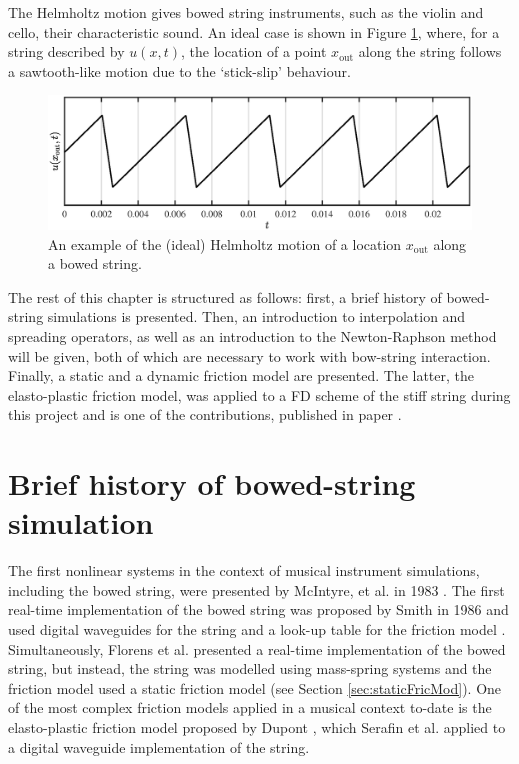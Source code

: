 The Helmholtz motion gives bowed string instruments, such as the violin and cello, their characteristic sound. An ideal case is shown in Figure \ref{fig:helmholtzTimedomain}, where, for a string described by $u(x,t)$, the location of a point $x_\text{out}$ along the string follows a sawtooth-like motion due to the `stick-slip' behaviour. 
\begin{figure}[t]
    \centering
    \includegraphics[width=\textwidth]{figures/exciters/helmholtzTimedomain.eps}
    \caption{An example of the (ideal) Helmholtz motion of a location $x_\text{out}$ along a bowed string. \label{fig:helmholtzTimedomain}}
\end{figure}

The rest of this chapter is structured as follows: first, a brief history of bowed-string simulations is presented. Then, an introduction to interpolation and spreading operators, as well as an introduction to the Newton-Raphson method will be given, both of which are necessary to work with bow-string interaction. Finally, a static and a dynamic friction model are presented. The latter, the elasto-plastic friction model, was applied to a FD scheme of the stiff string during this project and is one of the contributions, published in paper \citeP[C].

\section{Brief history of bowed-string simulation}
The first nonlinear systems in the context of musical instrument simulations, including the bowed string, were presented by McIntyre, et al. in 1983 \cite{McIntyre1983}. The first real-time implementation of the bowed string was proposed by Smith in 1986 and used digital waveguides for the string and a look-up table for the friction model \cite{Smith1986}. Simultaneously, Florens et al. presented a real-time implementation of the bowed string, but instead, the string was modelled using mass-spring systems and the friction model used a static friction model \cite{Florens1986} (see Section \ref{sec:staticFricMod}). One of the most complex friction models applied in a musical context to-date is the elasto-plastic friction model proposed by Dupont \cite{Dupont2002}, which Serafin et al. \cite{Serafin2003, Serafin2004} applied to a digital waveguide implementation of the string. 

